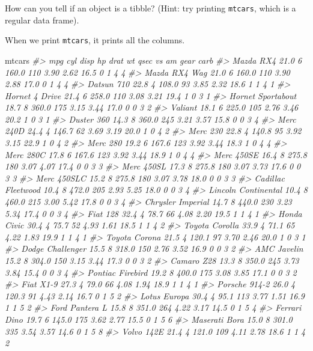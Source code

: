 \documentclass[]{book}
\newenvironment{Shaded}{\begin{snugshade}}{\end{snugshade}}
\newcommand{\CommentTok}[1]{\textcolor[rgb]{0.56,0.35,0.01}{\textit{#1}}}
\newcommand{\NormalTok}[1]{#1}
\theoremstyle{plain}
\theoremstyle{remark}
\begin{document}
How can you tell if an object is a tibble? (Hint: try printing
\texttt{mtcars}, which is a regular data frame).

When we print \texttt{mtcars}, it prints all the columns.

\begin{Shaded}
\begin{Highlighting}[]
\NormalTok{mtcars}
\CommentTok{#>                      mpg cyl  disp  hp drat   wt qsec vs am gear carb}
\CommentTok{#> Mazda RX4           21.0   6 160.0 110 3.90 2.62 16.5  0  1    4    4}
\CommentTok{#> Mazda RX4 Wag       21.0   6 160.0 110 3.90 2.88 17.0  0  1    4    4}
\CommentTok{#> Datsun 710          22.8   4 108.0  93 3.85 2.32 18.6  1  1    4    1}
\CommentTok{#> Hornet 4 Drive      21.4   6 258.0 110 3.08 3.21 19.4  1  0    3    1}
\CommentTok{#> Hornet Sportabout   18.7   8 360.0 175 3.15 3.44 17.0  0  0    3    2}
\CommentTok{#> Valiant             18.1   6 225.0 105 2.76 3.46 20.2  1  0    3    1}
\CommentTok{#> Duster 360          14.3   8 360.0 245 3.21 3.57 15.8  0  0    3    4}
\CommentTok{#> Merc 240D           24.4   4 146.7  62 3.69 3.19 20.0  1  0    4    2}
\CommentTok{#> Merc 230            22.8   4 140.8  95 3.92 3.15 22.9  1  0    4    2}
\CommentTok{#> Merc 280            19.2   6 167.6 123 3.92 3.44 18.3  1  0    4    4}
\CommentTok{#> Merc 280C           17.8   6 167.6 123 3.92 3.44 18.9  1  0    4    4}
\CommentTok{#> Merc 450SE          16.4   8 275.8 180 3.07 4.07 17.4  0  0    3    3}
\CommentTok{#> Merc 450SL          17.3   8 275.8 180 3.07 3.73 17.6  0  0    3    3}
\CommentTok{#> Merc 450SLC         15.2   8 275.8 180 3.07 3.78 18.0  0  0    3    3}
\CommentTok{#> Cadillac Fleetwood  10.4   8 472.0 205 2.93 5.25 18.0  0  0    3    4}
\CommentTok{#> Lincoln Continental 10.4   8 460.0 215 3.00 5.42 17.8  0  0    3    4}
\CommentTok{#> Chrysler Imperial   14.7   8 440.0 230 3.23 5.34 17.4  0  0    3    4}
\CommentTok{#> Fiat 128            32.4   4  78.7  66 4.08 2.20 19.5  1  1    4    1}
\CommentTok{#> Honda Civic         30.4   4  75.7  52 4.93 1.61 18.5  1  1    4    2}
\CommentTok{#> Toyota Corolla      33.9   4  71.1  65 4.22 1.83 19.9  1  1    4    1}
\CommentTok{#> Toyota Corona       21.5   4 120.1  97 3.70 2.46 20.0  1  0    3    1}
\CommentTok{#> Dodge Challenger    15.5   8 318.0 150 2.76 3.52 16.9  0  0    3    2}
\CommentTok{#> AMC Javelin         15.2   8 304.0 150 3.15 3.44 17.3  0  0    3    2}
\CommentTok{#> Camaro Z28          13.3   8 350.0 245 3.73 3.84 15.4  0  0    3    4}
\CommentTok{#> Pontiac Firebird    19.2   8 400.0 175 3.08 3.85 17.1  0  0    3    2}
\CommentTok{#> Fiat X1-9           27.3   4  79.0  66 4.08 1.94 18.9  1  1    4    1}
\CommentTok{#> Porsche 914-2       26.0   4 120.3  91 4.43 2.14 16.7  0  1    5    2}
\CommentTok{#> Lotus Europa        30.4   4  95.1 113 3.77 1.51 16.9  1  1    5    2}
\CommentTok{#> Ford Pantera L      15.8   8 351.0 264 4.22 3.17 14.5  0  1    5    4}
\CommentTok{#> Ferrari Dino        19.7   6 145.0 175 3.62 2.77 15.5  0  1    5    6}
\CommentTok{#> Maserati Bora       15.0   8 301.0 335 3.54 3.57 14.6  0  1    5    8}
\CommentTok{#> Volvo 142E          21.4   4 121.0 109 4.11 2.78 18.6  1  1    4    2}
\end{Highlighting}
\end{Shaded}
\end{document}
